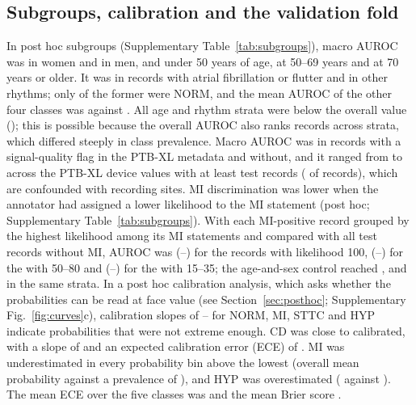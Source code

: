 \subsection{Subgroups, calibration and the validation fold}
In post hoc subgroups (Supplementary Table~\ref{tab:subgroups}), macro AUROC was \PHSubWomen{} in
women and \PHSubMen{} in men, and \PHSubYoung{} under 50 years of age, \PHSubAgeMid{} at 50--69 years and \PHSubOld{} at
70 years or older. It was \PHSubAF{} in records with atrial fibrillation or flutter and \PHSubNotAF{} in other rhythms;
only \PHSubAFNormPos{} of the former were NORM, and the mean AUROC of the other four classes was \PHSubAFNoNorm{}
against \PHSubNotAFNoNorm. All age and rhythm strata were below the overall value (\MainAUROC); this is possible because the
overall AUROC also ranks records across strata, which differed steeply in class prevalence. Macro
AUROC was \PHSubNoise{} in records with a signal-quality flag in the PTB-XL metadata and
\PHSubNoNoise{} without, and it ranged from \PHSubDeviceMin{} to \PHSubDeviceMax{} across the \PHSubNDevices{} PTB-XL
device values with at least \PHMinSubgroup{} test records (\PHSubDeviceRecordsN{} of \NTest{} records), which are
confounded with recording sites. MI discrimination was lower when the annotator had assigned a lower likelihood to
the MI statement (post hoc; Supplementary Table~\ref{tab:subgroups}). With each MI-positive record grouped by the highest likelihood among its MI statements and
compared with all test records without MI, AUROC was \PHMILikHundred{} (\PHMILikHundredLow--\PHMILikHundredHigh) for
the \PHMILikHundredN{} records with likelihood 100, \PHMILikMid{} (\PHMILikMidLow--\PHMILikMidHigh) for the
\PHMILikMidN{} with 50--80 and \PHMILikLow{} (\PHMILikLowLow--\PHMILikLowHigh) for the \PHMILikLowN{} with 15--35;
the age-and-sex control reached \PHMILikHundredAgeSex, \PHMILikMidAgeSex{} and \PHMILikLowAgeSex{} in the same strata.
In a post hoc calibration analysis, which asks whether the probabilities can be read at face value (see Section~\ref{sec:posthoc};
Supplementary Fig.~\ref{fig:curves}c), calibration slopes of \PHSlopeMinNoCD--\PHSlopeMaxNoCD{} for NORM, MI, STTC and
HYP indicate probabilities that were not extreme enough. CD was close to calibrated, with a slope of \PHSlopeCD{} and an expected calibration error (ECE) of \PHECECD. MI was
underestimated in every probability bin above the lowest (overall mean probability \PHMeanPMI{} against a prevalence
of \PHPrevMI), and HYP was overestimated (\PHMeanPHYP{} against \PHPrevHYP). The mean ECE over the five classes was
\PHECEMean{} and the mean Brier score \PHBrierMean.

